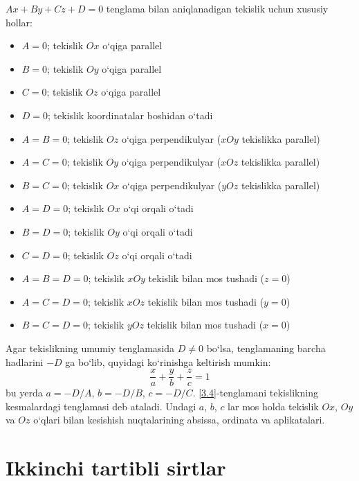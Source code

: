 $Ax+By+Cz+D=0$ tenglama bilan aniqlanadigan tekislik uchun xususiy hollar:
\begin{itemize}
	\item $A=0$; tekislik $Ox$ o`qiga parallel
	\item $B=0$; tekislik $Oy$ o`qiga parallel
	\item $C=0$; tekislik $Oz$ o`qiga parallel
	\item $D=0$; tekislik koordinatalar boshidan o`tadi
	\item $A=B=0$; tekislik $Oz$ o`qiga perpendikulyar ($xOy$ tekislikka parallel)
	\item $A=C=0$; tekislik $Oy$ o`qiga perpendikulyar ($xOz$ tekislikka parallel)
	\item $B=C=0$; tekislik $Ox$ o`qiga perpendikulyar ($yOz$ tekislikka parallel)
	\item $A=D=0$; tekislik $Ox$ o`qi orqali o`tadi
	\item $B=D=0$; tekislik $Oy$ o`qi orqali o`tadi
	\item $C=D=0$; tekislik $Oz$ o`qi orqali o`tadi
	\item $A=B=D=0$; tekislik $xOy$ tekislik bilan mos tushadi ($z=0$)
	\item $A=C=D=0$; tekislik $xOz$ tekislik bilan mos tushadi ($y=0$)
	\item $B=C=D=0$; tekislik $yOz$ tekislik bilan mos tushadi ($x=0$)
\end{itemize}
Agar tekislikning umumiy tenglamasida $D\ne0$ bo`lsa, tenglamaning barcha hadlarini $-D$ ga bo`lib, quyidagi ko`rinishga keltirish mumkin:
\begin{equation}
	\frac{x}{a}+\frac{y}{b}+\frac{z}{c}=1
	\label{3.4}
\end{equation}
bu yerda $a=-D/A$, $b=-D/B$, $c=-D/C$. \eqref{3.4}-tenglamani tekislikning kesmalardagi tenglamasi deb ataladi. Undagi $a$, $b$, $c$ lar mos holda tekislik $Ox$, $Oy$ va $Oz$ o`qlari bilan kesishish nuqtalarining absissa, ordinata va aplikatalari.
\section{Ikkinchi tartibli sirtlar}

